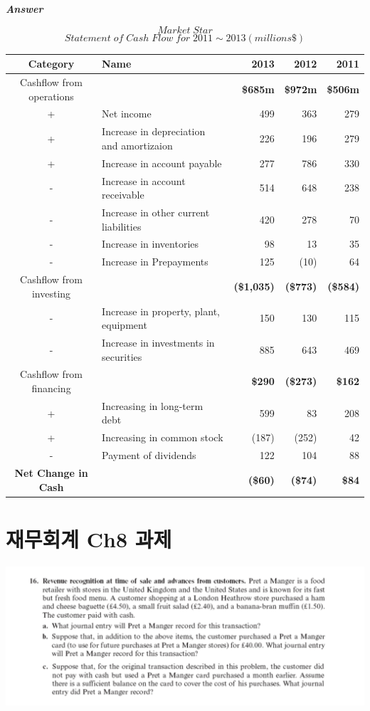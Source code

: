 \documentclass[
  a4paper,
  DIV=11,
  numbers=noendperiod]{scrreprt}
\begin{document}
\textbf{\emph{Answer}}

\[Market\;Star\]
\[Statement\;of\;Cash\;Flow\;for\;2011\sim 2013(millions\$)\]

\begin{longtable}[]{@{}clrrr@{}}
\toprule\noalign{}
Category & Name & 2013 & 2012 & 2011 \\
\midrule\noalign{}
\endhead
\bottomrule\noalign{}
\endlastfoot
Cashflow from operations & & \textbf{\$685m} & \textbf{\$972m} &
\textbf{\$506m} \\
+ & Net income & 499 & 363 & 279 \\
+ & Increase in depreciation and amortizaion & 226 & 196 & 279 \\
+ & Increase in account payable & 277 & 786 & 330 \\
- & Increase in account receivable & 514 & 648 & 238 \\
- & Increase in other current liabilities & 420 & 278 & 70 \\
- & Increase in inventories & 98 & 13 & 35 \\
- & Increase in Prepayments & 125 & (10) & 64 \\
Cashflow from investing & & \textbf{(\$1,035)} & \textbf{(\$773)} &
\textbf{(\$584)} \\
- & Increase in property, plant, equipment & 150 & 130 & 115 \\
- & Increase in investments in securities & 885 & 643 & 469 \\
Cashflow from financing & & \textbf{\$290} & \textbf{(\$273)} &
\textbf{\$162} \\
+ & Increasing in long-term debt & 599 & 83 & 208 \\
+ & Increasing in common stock & (187) & (252) & 42 \\
- & Payment of dividends & 122 & 104 & 88 \\
\textbf{Net Change in Cash} & & \textbf{(\$60)} & \textbf{(\$74)} &
\textbf{\$84} \\
\end{longtable}

\chapter*{재무회계 Ch8
과제}\label{uxc7acuxbb34uxd68cuxacc4-ch8-uxacfcuxc81c}


\includegraphics{images/재무회계8-16.png}
\end{document}
